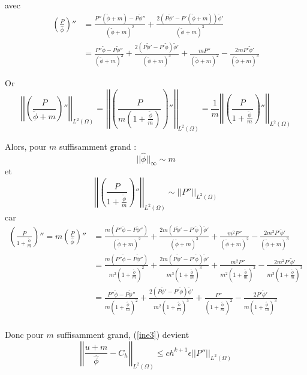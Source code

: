 avec
\begin{align*}
	\left(\frac{P}{\hat{\phi}}\right)''&=\frac{P''(\tilde{\phi}+m)-P\tilde{\phi}''}{(\tilde{\phi}+m)^2}+\frac{2(P\tilde{\phi}'-P'(\tilde{\phi}+m))\tilde{\phi}'}{(\tilde{\phi}+m)^3} \\
	&=\frac{P''\tilde{\phi}-P\tilde{\phi}''}{(\tilde{\phi}+m)^2}+\frac{2(P\tilde{\phi}'-P'\tilde{\phi})\tilde{\phi}'}{(\tilde{\phi}+m)^3}+    \frac{mP''}{(\tilde{\phi}+m)^2}-\frac{2mP'\tilde{\phi}'}{(\tilde{\phi}+m)^3}
\end{align*}

Or 
$$\left|\left|\left(\frac{P}{\tilde{\phi}+m}\right)''\right|\right|_{L^2(\Omega)}=\left|\left|\left(\frac{P}{m\left(1+\frac{\tilde{\phi}}{m}\right)}\right)''\right|\right|_{L^2(\Omega)}=\frac{1}{m}\left|\left|\left(\frac{P}{1+\frac{\tilde{\phi}}{m}}\right)''\right|\right|_{L^2(\Omega)}$$

Alors, pour $m$ suffisamment grand :
$$||\hat{\phi}||_\infty\sim m$$
et
$$\left|\left|\left(\frac{P}{1+\frac{\tilde{\phi}}{m}}\right)''\right|\right|_{L^2(\Omega)}\sim\left|\left|P''\right|\right|_{L^2(\Omega)}$$
car
\begin{align*}
	\left(\frac{P}{1+\frac{\tilde{\phi}}{m}}\right)''=m\left(\frac{P}{\hat{\phi}}\right)''&=\frac{m(P''\tilde{\phi}-P\tilde{\phi}'')}{(\tilde{\phi}+m)^2}+\frac{2m(P\tilde{\phi}'-P'\tilde{\phi})\tilde{\phi}'}{(\tilde{\phi}+m)^3}+    \frac{m^2P''}{(\tilde{\phi}+m)^2}-\frac{2m^2P'\tilde{\phi}'}{(\tilde{\phi}+m)^3} \\
	&=\frac{m(P''\tilde{\phi}-P\tilde{\phi}'')}{m^2\left(1+\frac{\tilde{\phi}}{m}\right)^2}+\frac{2m(P\tilde{\phi}'-P'\tilde{\phi})\tilde{\phi}'}{m^3\left(1+\frac{\tilde{\phi}}{m}\right)^3}+    \frac{m^2P''}{m^2\left(1+\frac{\tilde{\phi}}{m}\right)^2}-\frac{2m^2P'\tilde{\phi}'}{m^3\left(1+\frac{\tilde{\phi}}{m}\right)^3} \\
	&=\frac{P''\tilde{\phi}-P\tilde{\phi}''}{m\left(1+\frac{\tilde{\phi}}{m}\right)^2}+\frac{2(P\tilde{\phi}'-P'\tilde{\phi})\tilde{\phi}'}{m^2\left(1+\frac{\tilde{\phi}}{m}\right)^3}+    \frac{P''}{\left(1+\frac{\tilde{\phi}}{m}\right)^2}-\frac{2P'\tilde{\phi}'}{m\left(1+\frac{\tilde{\phi}}{m}\right)^3} \\
\end{align*}

Donc pour $m$ suffisamment grand, (\ref{ine3}) devient
\begin{equation}
	\left|\left|\frac{u+m}{\hat{\phi}}-C_h\right|\right|_{L^2(\Omega)}\le ch^{k+1}\epsilon\left|\left|P''\right|\right|_{L^2(\Omega)} \label{ine3_bis}
\end{equation}

